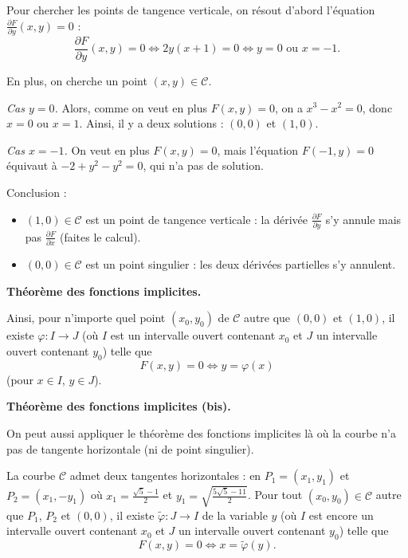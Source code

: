 \documentclass[11pt, class=report,crop=false]{standalone}
\begin{document}
Pour chercher les points de tangence verticale, on résout d'abord l'équation $\frac{\partial F}{\partial y}(x,y) = 0$ :
$$\frac{\partial F}{\partial y}(x,y) = 0 \iff  2y(x+1)=0 \iff y=0 \text{ ou } x=-1.$$

En plus, on cherche un point $(x,y) \in \mathcal{C}$.

\emph{Cas $y=0$.} Alors, comme on veut en plus $F(x,y)=0$, on a $x^3-x^2=0$, donc $x=0$ ou $x=1$.
Ainsi, il y a deux solutions : $(0,0)$ et $(1,0)$.

\emph{Cas $x=-1$.} On veut en plus $F(x,y)=0$, mais l'équation $F(-1,y)=0$ équivaut à 
$-2+y^2-y^2=0$, qui n'a pas de solution.

Conclusion :
\begin{itemize}
     \item $(1,0) \in \mathcal{C}$ est un point de tangence verticale : la dérivée $\frac{\partial F}{\partial y}$ s'y annule mais pas  $\frac{\partial F}{\partial x}$ (faites le calcul).
     
     \item $(0,0) \in \mathcal{C}$ est un point singulier : les deux dérivées partielles s'y annulent.
\end{itemize}

\bigskip

\textbf{Théorème des fonctions implicites.}

Ainsi, pour n'importe quel point $(x_0,y_0)$ de $\mathcal{C}$ autre que $(0,0)$ et $(1,0)$, il existe $\varphi :I \to J$ (où $I$ est un intervalle ouvert contenant $x_0$ et $J$ un intervalle ouvert contenant $y_0$) telle que 
$$F(x,y) = 0 \iff y = \varphi(x)$$
(pour $x \in I$, $y \in J$).


\bigskip

\textbf{Théorème des fonctions implicites (bis).}

On peut aussi appliquer le théorème des fonctions implicites là où la courbe n'a pas de tangente horizontale (ni de point singulier).

La courbe $\mathcal{C}$ admet deux tangentes horizontales : en $P_1=(x_1,y_1)$ et $P_2=(x_1,-y_1)$ où $x_1 = \frac{\sqrt5-1}{2}$ et $y_1 = \sqrt{\frac{5\sqrt{5}-11}{2}}$.
Pour tout $(x_0,y_0) \in \mathcal{C}$ autre que $P_1$, $P_2$ et $(0,0)$, il existe $\tilde\varphi : J \to I$ de la variable $y$ (où $I$ est encore un intervalle ouvert contenant $x_0$ et $J$ un intervalle ouvert contenant $y_0$) telle que 
$$F(x,y) = 0 \iff x = \tilde\varphi(y).$$


\bigskip
\end{document}
